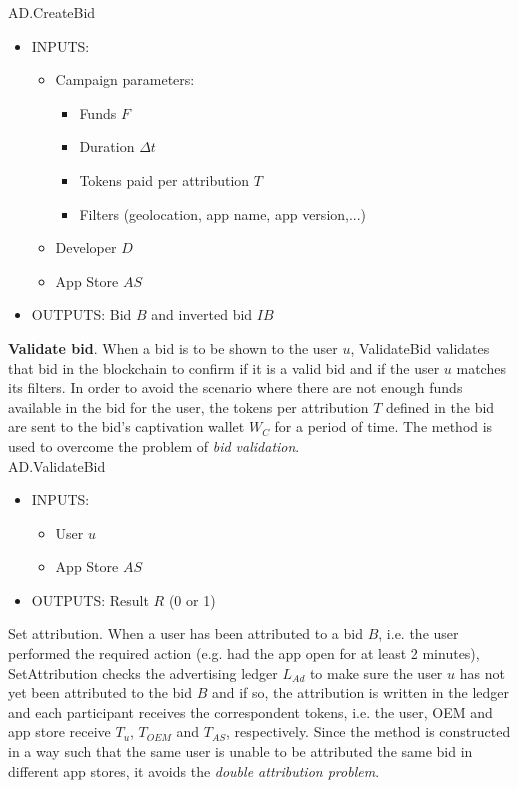 \textsf{AD.CreateBid}
\begin{itemize}
	\item INPUTS:
	\begin{itemize}
		\item Campaign parameters:
		\begin{itemize}
			\item Funds $F$
			\item Duration $\Delta t$
			\item Tokens paid per attribution $T$
			\item Filters (geolocation, app name, app version,...)
		\end{itemize}
		\item Developer $D$
		\item App Store $AS$ %
	\end{itemize}
	\item OUTPUTS: Bid $B$ and inverted bid $IB$
\end{itemize}

\noindent \textbf{Validate bid}. When a bid is to be shown to the user $u$, \textsf{ValidateBid} validates that bid in the blockchain to confirm if it is a valid bid and if the user $u$ matches its filters. In order to avoid the scenario where there are not enough funds available in the bid for the user, the tokens per attribution $T$ defined in the bid are sent to the bid's captivation wallet $W_C$ for a period of time. The method is used to overcome the problem of \textit{bid validation}. \\

\textsf{AD.ValidateBid}
\begin{itemize}
	\item INPUTS:
	\begin{itemize}
		\item User $u$
		\item App Store $AS$
	\end{itemize}
	\item OUTPUTS: Result $R$ (0 or 1)
\end{itemize}

\noindent \textsf{Set attribution}. When a user has been attributed to a bid $B$, i.e. the user performed the required action (e.g. had the app open for at least 2 minutes), \textsf{SetAttribution} checks the advertising ledger $L_{Ad}$ to make sure the user $u$ has not yet been attributed to the bid $B$ and if so, the attribution is written in the ledger and each participant receives the correspondent tokens, i.e. the user, OEM and app store receive $T_u$, $T_{OEM}$ and $T_{AS}$, respectively. Since the method is constructed in a way such that the same user is unable to be attributed the same bid in different app stores, it avoids the \textit{double attribution problem}. \\

